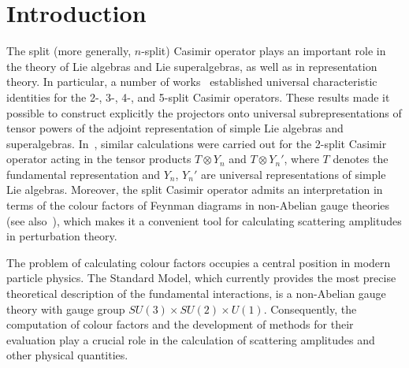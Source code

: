 \documentclass[a4paper]{article}
\renewcommand{\=}{\ =\ }
\numberwithin{equation}{section}
\theoremstyle{remark}
\begin{document}
\newpage

\setcounter{page}{2}



\section{Introduction}
The split (more generally, $n$-split) Casimir operator plays an important role in the theory of Lie algebras and Lie superalgebras, as well as in representation theory. In particular, a number of works~\cite{IsKrad2,IsPrad2,IsKrPrad3,IsPrad3,Prad3,IsKrMkAv,IsKrad5} established universal characteristic identities for the 2-, 3-, 4-, and 5-split Casimir operators. These results made it possible to construct explicitly the projectors onto universal subrepresentations of tensor powers of the adjoint representation of simple Lie algebras and superalgebras. In~\cite{IsVUB}, similar calculations were carried out for the 2-split Casimir operator acting in the tensor products $T\otimes Y_n$ and $T\otimes Y_n'$, where $T$ denotes the fundamental representation and $Y_n$, $Y_n'$ are universal representations of simple Lie algebras. Moreover, the split Casimir operator admits an interpretation in terms of the colour factors of Feynman diagrams in non-Abelian gauge theories~\cite{IsPr:Colour} (see also~\cite{Cvit}), which makes it a convenient tool for calculating scattering amplitudes in perturbation theory.

The problem of calculating colour factors occupies a central position in modern particle physics. The Standard Model, which currently provides the most precise theoretical description of the fundamental interactions, is a non-Abelian gauge theory with gauge group $SU(3) \times SU(2) \times U(1)$. Consequently, the computation of colour factors and the development of methods for their evaluation play a crucial role in the calculation of scattering amplitudes and other physical quantities.
\end{document}
